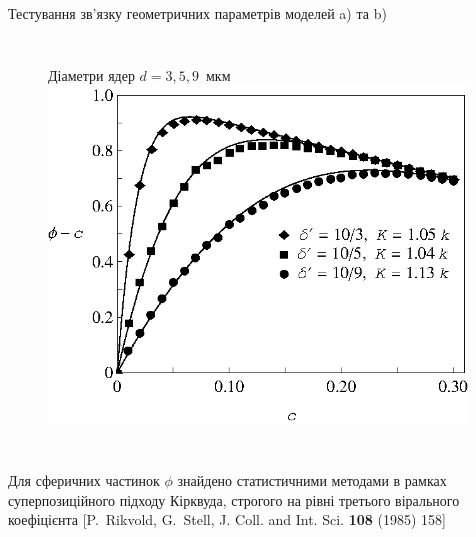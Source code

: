\documentclass[10pt]{beamer}
\begin{document}
\begin{frame}{Тестування зв'язку геометричних параметрів моделей a) та b)}
\begin{columns}[T,onlytextwidth]
      \begin{figure}
        \centering
        \qquad Діаметри ядер $d=3,5,9$~мкм
        \includegraphics[width=0.99\textwidth]{images/Fig3_SiekierskiShell_103-9.eps}
      \end{figure}
\end{columns}

\begin{columns}[T,onlytextwidth]
      \vspace{5pt}
    Для сферичних частинок $\phi$ знайдено статистичними методами в рамках суперпозиційного підходу Кірквуда, строгого на рівні третього вірального коефіцієнта  [P.~Rikvold, G.~Stell, J. Coll. and Int. Sci. {\bf 108} (1985) 158]


\end{columns}
\end{frame}
\end{document}
